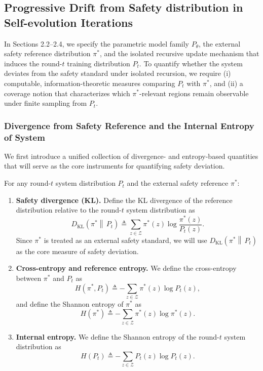 \subsection{Progressive Drift from Safety distribution in Self-evolution Iterations}
\label{sec:2-5-thermodynamics-and-information-measures}

In Sections 2.2--2.4, we specify the parametric model family $P_\theta$, the external safety reference distribution $\pi^\ast$, and the isolated recursive update mechanism that induces the round-$t$ training distribution $P_t$.
To quantify whether the system deviates from the safety standard under isolated recursion, we require (i) computable, information-theoretic measures comparing $P_t$ with $\pi^\ast$, and (ii) a coverage notion that characterizes which $\pi^\ast$-relevant regions remain observable under finite sampling from $P_t$.

\subsubsection{Divergence from Safety Reference and the Internal Entropy of System}
\label{sec:2-5-1-alignment-error-decomposition}

We first introduce a unified collection of divergence- and entropy-based quantities that will serve as the core instruments for quantifying safety deviation.

\begin{definition}
\label{def:2-6-safety-divergence}
\label{def:2-7-cross-entropy}
\label{def:2-8-internal-entropy}

For any round-$t$ system distribution $P_t$ and the external safety reference $\pi^\ast$:

\begin{enumerate}
    \item \textbf{Safety divergence (KL).} Define the KL divergence of the reference distribution relative to the round-$t$ system distribution as
    \[
    D_{\mathrm{KL}}\!\left(\pi^\ast \middle\|\, P_t\right)\triangleq \sum_{z\in\mathcal{Z}} \pi^\ast(z)\log\frac{\pi^\ast(z)}{P_t(z)}.
    \]
    Since $\pi^\ast$ is treated as an external safety standard, we will use
    $D_{\mathrm{KL}}\!\left(\pi^\ast \middle\|\, P_t\right)$ as the core measure of safety deviation.

    \item \textbf{Cross-entropy and reference entropy.} We define the cross-entropy between $\pi^\ast$ and $P_t$ as
    \[
    H(\pi^\ast,P_t)\triangleq -\sum_{z\in\mathcal{Z}} \pi^\ast(z)\log P_t(z),
    \]
    and define the Shannon entropy of $\pi^\ast$ as
    \[
    H(\pi^\ast)\triangleq -\sum_{z\in\mathcal{Z}} \pi^\ast(z)\log \pi^\ast(z).
    \]

    \item \textbf{Internal entropy.} We define the Shannon entropy of the round-$t$ system distribution as
    \[
    H(P_t)\triangleq -\sum_{z\in\mathcal{Z}} P_t(z)\log P_t(z).
    \]
\end{enumerate}

\end{definition}

